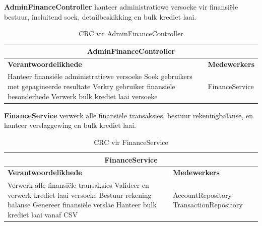 \vspace{1em}
\textbf{AdminFinanceController} hanteer administratiewe versoeke vir finansiële bestuur, insluitend soek, detailbeskikking en bulk krediet laai.
\begin{table}[H]
\centering
\begin{tabular}{|p{}|p{}|}
    \hline
    \multicolumn{2}{|c|}{\textbf{AdminFinanceController}} \\
    \hline
    \textbf{Verantwoordelikhede} & \textbf{Medewerkers} \\
    \hline
    Hanteer finansiële administratiewe versoeke \newline
    Soek gebruikers met gepagineerde resultate \newline
    Verkry gebruiker finansiële besonderhede \newline
    Verwerk bulk krediet laai versoeke
    &
    FinanceService \\
    \hline
\end{tabular}
\caption{CRC vir AdminFinanceController}
\label{tab:crc_admin_finance_controller}
\end{table}

\vspace{1em}
\textbf{FinanceService} verwerk alle finansiële transaksies, bestuur rekeningbalanse, en hanteer verslaggewing en bulk krediet laai.
\begin{table}[H]
\centering
\begin{tabular}{|p{}|p{}|}
    \hline
    \multicolumn{2}{|c|}{\textbf{FinanceService}} \\
    \hline
    \textbf{Verantwoordelikhede} & \textbf{Medewerkers} \\
    \hline
    Verwerk alle finansiële transaksies \newline
    Valideer en verwerk krediet laai versoeke \newline
    Bestuur rekening balanse \newline
    Genereer finansiële verslae \newline
    Hanteer bulk krediet laai vanaf CSV
    &
    AccountRepository \newline
    TransactionRepository \\
    \hline
\end{tabular}
\caption{CRC vir FinanceService}
\label{tab:crc_finance_service}
\end{table}

